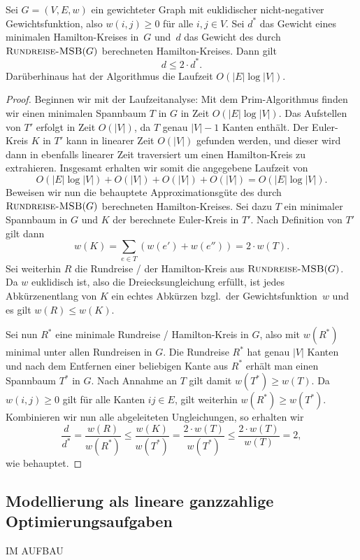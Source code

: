 \begin{thm}
Sei $G=(V,E,w)$ ein gewichteter Graph mit euklidischer nicht-negativer Gewichtsfunktion, also $w(i,j) \geq 0$ für alle $i,j \in V$.
Sei $d^\ast$ das Gewicht eines minimalen Hamilton-Kreises in~$G$ und~$d$ das Gewicht des durch $\mathop{\text{\textsc{Rundreise-MSB}}}(G)$ berechneten Hamilton-Kreises.
Dann gilt
\[
d \leq 2 \cdot d^\ast.
\]
Darüberhinaus hat der Algorithmus die Laufzeit $O(|E| \log |V|)$.
\end{thm}
\begin{proof}
Beginnen wir mit der Laufzeitanalyse: Mit dem Prim-Algorithmus finden wir einen minimalen Spannbaum $T$ in $G$ in Zeit $O(|E| \log |V|)$. Das Aufstellen von $T'$ erfolgt in Zeit $O(|V|)$, da $T$ genau $|V|-1$ Kanten enthält. Der Euler-Kreis $K$ in $T'$ kann in linearer Zeit $O(|V|)$ gefunden werden, und dieser wird dann in ebenfalls linearer Zeit traversiert um einen Hamilton-Kreis zu extrahieren.
Insgesamt erhalten wir somit die angegebene Laufzeit von
\[
O(|E| \log |V|) + O(|V|) + O(|V|) + O(|V|) = O(|E| \log |V|).
\]
Beweisen wir nun die behauptete Approximationsgüte des durch $\mathop{\text{\textsc{Rundreise-MSB}}}(G)$ berechneten Hamilton-Kreises.
Sei dazu $T$ ein minimaler Spannbaum in $G$ und $K$ der berechnete Euler-Kreis in $T'$.
Nach Definition von $T'$ gilt dann
\[
w(K) = \sum_{e \in T} \left( w(e') + w(e'') \right) = 2 \cdot w(T).
\]
Sei weiterhin $R$ die Rundreise / der Hamilton-Kreis aus $\mathop{\text{\textsc{Rundreise-MSB}}}(G)$.
Da $w$ euklidisch ist, also die Dreiecksungleichung erfüllt, ist jedes \glqq Abkürzen\grqq entlang von $K$ ein echtes Abkürzen bzgl.~der Gewichtsfunktion~$w$ und es gilt $w(R) \leq w(K)$.

Sei nun $R^\ast$ eine minimale Rundreise / Hamilton-Kreis in $G$, also mit $w(R^\ast)$ minimal unter allen Rundreisen in $G$.
Die Rundreise $R^\ast$ hat genau $|V|$ Kanten und nach dem Entfernen einer beliebigen Kante aus $R^\ast$ erhält man einen Spannbaum $T^\ast$ in $G$.
Nach Annahme an $T$ gilt damit $w(T^\ast) \geq w(T)$.
Da $w(i,j) \geq 0$ gilt für alle Kanten $ij \in E$, gilt weiterhin $w(R^\ast) \geq w(T^\ast)$.
Kombinieren wir nun alle abgeleiteten Ungleichungen, so erhalten wir
\[
\frac{d}{d^\ast} = \frac{w(R)}{w(R^\ast)} \leq \frac{w(K)}{w(T^\ast)} = \frac{2 \cdot w(T)}{w(T^\ast)} \leq \frac{2 \cdot w(T)}{w(T)} = 2,
\]
wie behauptet.
\end{proof}

\condclearpage
\subsection{Modellierung als lineare ganzzahlige Optimierungsaufgaben}

IM AUFBAU